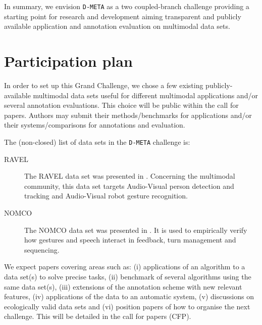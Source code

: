 \documentclass{sig-alternate}
\begin{document}
In summary, we envision \texttt{D-META} as a two coupled-branch challenge providing a starting point for research and
development aiming transparent and publicly available application and annotation evaluation on multimodal data sets.

\section{Participation plan}
In order to set up this Grand Challenge, we chose a few existing publicly-available multimodal data sets useful
for different multimodal applications and/or several annotation evaluations. This choice will be public within the call
for papers. Authors may submit their methods/benchmarks for applications and/or their systems/comparisons for
annotations and evaluation.\vspace{0.4cm}

The (non-closed) list of data sets in the \texttt{D-META} challenge is:
\begin{description}
 \item [RAVEL] The RAVEL data set was presented in \cite{Ravel}. Concerning the multimodal community, this data set
targets Audio-Visual person detection and tracking and Audio-Visual robot gesture recognition.
 \item [NOMCO] The NOMCO data set was presented in \cite{Paggio10}. It is used to empirically verify
how gestures and speech interact in feedback, turn management and sequencing.
\end{description}

We expect papers covering areas such as: (i) applications of an algorithm to a data set(s) to solve precise tasks,
(ii) benchmark of several algorithms using the same data set(s), (iii) extensions of the annotation scheme with new
relevant features, (iv) applications of the data to an automatic system, (v) discussions on ecologically valid data sets
and (vi) position papers of how to organise the next challenge. This will be detailed in the call for papers (CFP).
\end{document}
